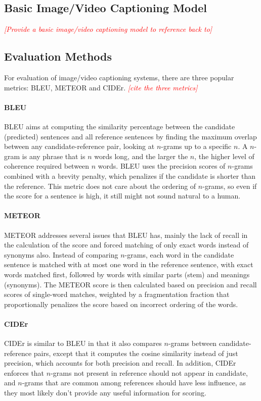 \documentclass[12pt,onecolumn,letterpaper,draftclsnofoot]{article}
\newcommand{\todo}[1]{\textcolor{red}{{\em [#1]}} }
\begin{document}
\subsection{Basic Image/Video Captioning Model}

\todo{Provide a basic image/video captioning model to reference back to}

\subsection{Evaluation Methods}

For evaluation of image/video captioning systems, there are three popular
metrics: BLEU, METEOR and CIDEr. \todo{cite the three metrics}

\paragraph{BLEU}
BLEU aims at computing the similarity percentage between the candidate
(predicted) sentences and all reference sentences by finding the maximum
overlap between any candidate-reference pair, looking at $n$-grams up to a
specific $n$. A $n$-gram is any phrase that is $n$ words long, and the larger
the $n$, the higher level of coherence required between $n$ words. BLEU uses
the precision scores of $n$-grams combined with a brevity penalty, which
penalizes if the candidate is shorter than the reference. This metric
does not care about the ordering of $n$-grams, so even if the score for a
sentence is high, it still might not sound natural to a human.

\paragraph{METEOR}
METEOR addresses several issues that BLEU has, mainly the lack of recall in
the calculation of the score and forced matching of only exact words instead
of synonyms also. Instead of comparing $n$-grams, each word in the candidate
sentence is matched with at most one word in the reference sentence, with
exact words matched first, followed by words with similar parts (stem) and
meanings (synonyms). The METEOR score is then calculated based on precision
and recall scores of single-word matches, weighted by a fragmentation fraction
that proportionally penalizes the score based on incorrect ordering of the
words.

\paragraph{CIDEr}
CIDEr is similar to BLEU in that it also compares $n$-grams between
candidate-reference pairs, except that it computes the cosine similarity
instead of just precision, which accounts for both precision and recall. In
addition, CIDEr enforces that $n$-grams not present in reference should not
appear in candidate, and $n$-grams that are common among references should
have less influence, as they most likely don't provide any useful information
for scoring.
\end{document}
